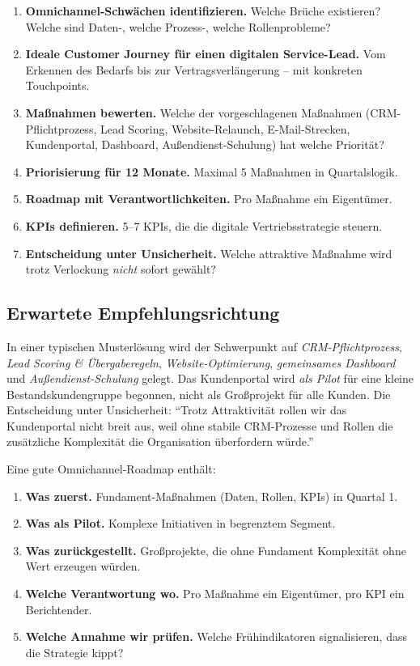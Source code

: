 \documentclass[11pt,a4paper,oneside]{article}
\begin{document}
\begin{enumerate}
  \item \textbf{Omnichannel-Schwächen identifizieren.} Welche Brüche existieren? Welche sind Daten-, welche Prozess-, welche Rollenprobleme?
  \item \textbf{Ideale Customer Journey für einen digitalen Service-Lead.} Vom Erkennen des Bedarfs bis zur Vertragsverlängerung -- mit konkreten Touchpoints.
  \item \textbf{Maßnahmen bewerten.} Welche der vorgeschlagenen Maßnahmen (CRM-Pflichtprozess, Lead Scoring, Website-Relaunch, E-Mail-Strecken, Kundenportal, Dashboard, Außendienst-Schulung) hat welche Priorität?
  \item \textbf{Priorisierung für 12 Monate.} Maximal 5 Maßnahmen in Quartalslogik.
  \item \textbf{Roadmap mit Verantwortlichkeiten.} Pro Maßnahme ein Eigentümer.
  \item \textbf{KPIs definieren.} 5--7 KPIs, die die digitale Vertriebsstrategie steuern.
  \item \textbf{Entscheidung unter Unsicherheit.} Welche attraktive Maßnahme wird trotz Verlockung \emph{nicht} sofort gewählt?
\end{enumerate}

\subsection{Erwartete Empfehlungsrichtung}

In einer typischen Musterlösung wird der Schwerpunkt auf \emph{CRM-Pflichtprozess}, \emph{Lead Scoring \& Übergaberegeln}, \emph{Website-Optimierung}, \emph{gemeinsames Dashboard} und \emph{Außendienst-Schulung} gelegt. Das Kundenportal wird \emph{als Pilot} für eine kleine Bestandskundengruppe begonnen, nicht als Großprojekt für alle Kunden. Die Entscheidung unter Unsicherheit: ``Trotz Attraktivität rollen wir das Kundenportal nicht breit aus, weil ohne stabile CRM-Prozesse und Rollen die zusätzliche Komplexität die Organisation überfordern würde.''

\begin{merkbox}
Eine gute Omnichannel-Roadmap enthält:
\begin{enumerate}
  \item \textbf{Was zuerst.} Fundament-Maßnahmen (Daten, Rollen, KPIs) in Quartal 1.
  \item \textbf{Was als Pilot.} Komplexe Initiativen in begrenztem Segment.
  \item \textbf{Was zurückgestellt.} Großprojekte, die ohne Fundament Komplexität ohne Wert erzeugen würden.
  \item \textbf{Welche Verantwortung wo.} Pro Maßnahme ein Eigentümer, pro KPI ein Berichtender.
  \item \textbf{Welche Annahme wir prüfen.} Welche Frühindikatoren signalisieren, dass die Strategie kippt?
\end{enumerate}
\end{merkbox}
\end{document}
